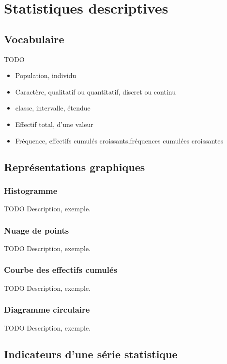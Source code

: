 \chapter{Statistiques descriptives}
\section{Vocabulaire}

TODO

\begin{itemize}
  \item Population, individu
  \item Caractère, qualitatif ou quantitatif, discret ou continu
  \item classe, intervalle, étendue
  \item Effectif total, d'une valeur
  \item Fréquence, effectifs cumulés croissants,fréquences cumulées croissantes
\end{itemize}

\section{Représentations graphiques}

\subsection{Histogramme}

TODO Description, exemple.

\subsection{Nuage de points}

TODO Description, exemple.

\subsection{Courbe des effectifs cumulés}

TODO Description, exemple.

\subsection{Diagramme circulaire}

TODO Description, exemple.


\section{Indicateurs d'une série statistique}

